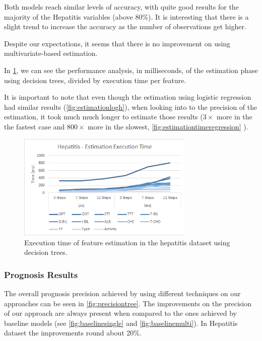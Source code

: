 Both models reach similar levels of accuracy, with quite good results for the majority of the Hepatitis variables
 (above 80\%). It is interesting that there is a slight trend to increase the accuracy as the number of observations get higher.

Despite our expectations, it seems that there is no improvement on using multivariate-based estimation.

In \ref{fig:estimationtimetree}, we can see the performance analysis, in milliseconds, of the estimation phase using decision 
trees, divided by execution time per feature.

It is important to note that even though the estimation using logistic regression had similar results (\ref{fig:estimationlogh}), when looking into to the precision of the estimation, it took much much longer to estimate those results
 ($3\times$ more in the the fastest case and $800\times$ more in the slowest, \ref{fig:estimationtimeregression} ).

\begin{figure}
  \centering
  \includegraphics[width=0.75\textwidth]{Figures/time_estimation_tree_h.png}
  \caption{Execution time of feature estimation in the hepatitis dataset using decision trees.}
  \label{fig:estimationtimetree}
\end{figure}

\subsubsection{Prognosis Results}
\label{subsubsection:prognosis_dt}

The overall prognosis precision achieved by using different techniques on our approaches can be seen in \ref{fig:precisiontree}. The improvements 
on the precision of our approach are always present when compared to the ones achieved by baseline models 
(see \ref{fig:baselinesingle} and \ref{fig:baselinemulti}). In Hepatitis dataset the improvements round about 20\%.

